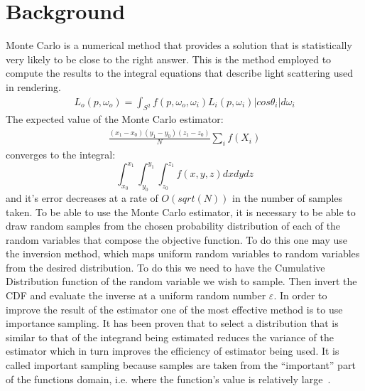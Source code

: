 \documentclass[conference]{acmsiggraph}
\begin{document}
\section{Background}
Monte Carlo is a numerical method that provides a solution that is statistically very likely to be close to the right answer. This is the method employed to compute the results to the integral equations that describe light scattering used in rendering. 
\begin{eqnarray}
L_{o}(p, \omega_{o}) = \int_{S^{2}}f(p, \omega_{o}, \omega_{i})L_{i}(p, \omega_{i})|cos \theta_{i}|d\omega_{i}
\end{eqnarray}
The expected value of the Monte Carlo estimator:
\begin{eqnarray}
\frac{(x_{1} - x_{0})(y_{1} - y_{0})(z_{1} - z_{0})}{N}\sum_{i}f(X_{i})
\end{eqnarray}
converges to the integral:
\begin{equation}
\int_{x_{0}}^{x_{1}}\int_{y_{0}}^{y_{1}}\int_{z_{0}}^{z_{1}}f(x, y, z)dxdydz
\end{equation}
and it's error decreases at a rate of $O(sqrt(N))$ in the number of samples taken. To be able to use the Monte Carlo estimator, it is necessary to be able to draw random samples from the chosen probability distribution of each of the random variables that compose the objective function. To do this one may use the inversion method, which maps uniform random variables to random variables from the desired distribution. To do this we need to have the Cumulative Distribution function of the random variable we wish to sample. Then invert the CDF and evaluate the inverse at a uniform random number $\varepsilon$.
In order to improve the result of the estimator one of the most effective method is to use importance sampling. It has been proven that to select a distribution that is similar to that of the integrand being estimated reduces the variance of the estimator which in turn improves the efficiency of estimator being used. It is called important sampling because samples are taken from the “important” part of the functions domain, i.e. where the function's value is relatively large~\cite{Pharr:2010:PBR}. 
\end{document}
